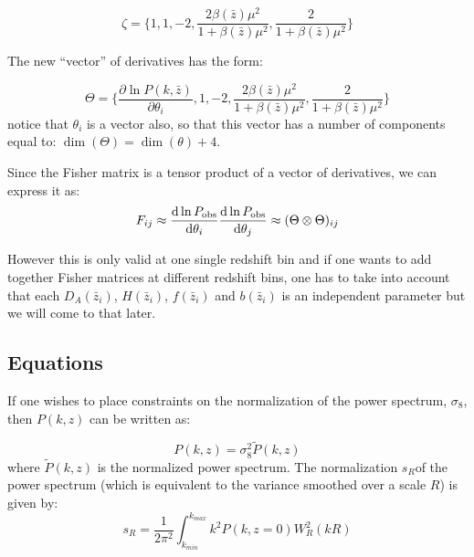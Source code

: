 \begin{equation}
\zeta=\{1,1,-2,\frac{2\beta(\bar{z})\mu^{2}}{1+\beta(\bar{z})\mu^{2}},\frac{2}{1+\beta(\bar{z})\mu^{2}}\}\label{eq:dPobsDFuncts}
\end{equation}


The new ``vector'' of derivatives has the form:

\begin{equation}
\Theta=\{\frac{\partial\ln P(k,\bar{z})}{\partial\theta_{i}},1,-2,\frac{2\beta(\bar{z})\mu^{2}}{1+\beta(\bar{z})\mu^{2}},\frac{2}{1+\beta(\bar{z})\mu^{2}}\}\label{eq:bigThetaVector}
\end{equation}
notice that $\theta_{i}$ is a vector also, so that this vector has
a number of components equal to: $\dim(\Theta)=\dim(\theta)+4$.

Since the Fisher matrix is a tensor product of a vector of derivatives,
we can express it as:
\begin{equation}
F_{ij}\approx\frac{\mbox{d}\ln P_{{\rm obs}}}{\mbox{d}\theta_{i}}\frac{\mbox{d}\ln P_{{\rm obs}}}{\mbox{d}\theta_{j}}\approx(\Theta\otimes\Theta)_{ij}\label{eq:FisherTensorProd-1}
\end{equation}


However this is only valid at one single redshift bin and if one wants
to add together Fisher matrices at different redshift bins, one has
to take into account that each $D_{A}(\bar{z}_{i})$, $H(\bar{z}_{i})$,
$f(\bar{z}_{i})$ and $b(\bar{z}_{i})$ is an independent parameter
but we will come to that later. 


\subsection{Equations}


If one wishes to place constraints on the normalization of the power
spectrum, $\sigma_{8}$, then $P(k,z)$ can be written as:

\begin{equation}
P(k,z)=\sigma_{8}^{2}\tilde{P}(k,z)\label{eq:normalizedPk}
\end{equation}
where $\tilde{P}(k,z)$ is the normalized power spectrum. The normalization
$s_{R}$of the power spectrum (which is equivalent to the variance
smoothed over a scale $R$) is given by:
\begin{equation}
s_{R}=\frac{1}{2\pi^{2}}\int_{k_{min}}^{k_{max}}k^{2}P(k,z=0)W_{R}^{2}(kR)\label{eq:normalizationPk}
\end{equation}


